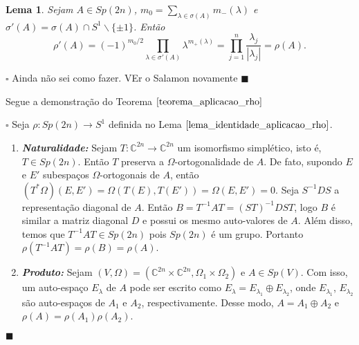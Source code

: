 \documentclass[12pt]{book}
\newtheorem{lema}[teorema]{Lema}
\newenvironment{prova}[1]{$\square$ #1}{\hfill$\blacksquare$}
\newcommand{\circulo}{S^{1}}
\newcommand{\complementar}[2]{#1 \backslash #2}
\newcommand{\complexo}[1]{\mathbb{C}^{#1}}
\newcommand{\gruposimpletico}[1]{Sp(#1)}
\newcommand{\vermelho}[1]{{\color{red}#1}}
\begin{document}
	\begin{lema}\label{lema_identidade_aplicacao_rho}
		Sejam $A \in \gruposimpletico{2n}$, $m_{0} = \sum_{\lambda \in \sigma(A)} m_{-}(\lambda)$  e $\sigma'(A)=\sigma(A)\cap \complementar{\circulo}{\{ \pm 1 \}}$. Então
		$$
		\rho'(A) = (-1)^{m_{0}/2} \prod_{\lambda \in \sigma'(A) }\lambda^{m_{+}(\lambda)} = \prod_{j=1}^{n}\frac{\lambda_{j}}{|\lambda_{j}|} = \rho(A).
		$$
	\end{lema}
	\begin{prova}
		\vermelho{Ainda não sei como fazer. VEr o Salamon novamente}
	\end{prova}
	
	Segue a demonstração do Teorema $\ref{teorema_aplicacao_rho}$
	
	\begin{prova}
		Seja $\rho :\gruposimpletico{2n} \to \circulo$ definida no Lema $\ref{lema_identidade_aplicacao_rho}$.
		\begin{enumerate}
			\item \label{item_naturalidade_rho} \textbf{\textit{Naturalidade:}} Sejam $T : \complexo{2n} \to \complexo{2n}$ um isomorfismo simplético, isto é, $T\in \gruposimpletico{2n}$. Então $T$ preserva a $\Omega$-ortogonalidade de $A$. De fato, supondo $E$ e $E'$ subespaços $\Omega$-ortogonais de $A$, então $(T^{*}\Omega)(E, E') = \Omega(T(
			E), T(E')) = \Omega(E, E') = 0$. Seja $S^{-1}DS$ a representação diagonal de $A$. Então $B = T^{-1}AT = (ST)^{-1}DST$, logo $B$ é similar a matriz diagonal $D$ e possui os mesmo auto-valores de $A$. Além disso, temos que $T^{-1}AT\in \gruposimpletico{2n}$ pois $\gruposimpletico{2n}$ é um grupo. Portanto $\rho(T^{-1}AT) = \rho(B) = \rho(A)$. 
			
			\item \textbf{\textit{Produto:}} Sejam $(V, \Omega) = (\complexo{2n}\times \complexo{2n}, \Omega_{1}\times \Omega_{2})$ e $A \in \gruposimpletico{V}$. Com isso, um auto-espaço $E_{\lambda}$ de $A$ pode ser escrito como $E_{\lambda} = E_{\lambda_{1}}\oplus E_{\lambda_{2}}$, onde $E_{\lambda_{1}}$, $E_{\lambda_{2}}$ são auto-espaços de $A_{1}$ e $A_{2}$, respectivamente. Desse modo, $A = A_{1}\oplus A_{2}$ e $\rho(A) = \rho(A_{1})\rho(A_{2})$.
			

\end{enumerate}
\end{prova}
\end{document}
